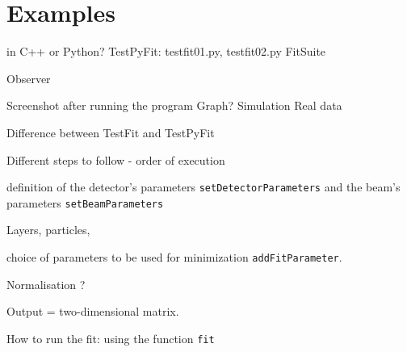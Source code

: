 \section{Examples}
in C++ or Python?
TestPyFit: testfit01.py, testfit02.py
FitSuite

Observer

Screenshot after running the program
Graph?
Simulation
Real data


Difference between TestFit and TestPyFit

Different steps to follow - order of execution


 definition of the detector's
  parameters \texttt{setDetectorParameters} and the beam's parameters
  \texttt{setBeamParameters}


Layers, particles, 


choice of parameters
  to be used for minimization \texttt{addFitParameter}. 


Normalisation ?

Output = two-dimensional matrix.

How to run the fit: using the function \texttt{fit}



